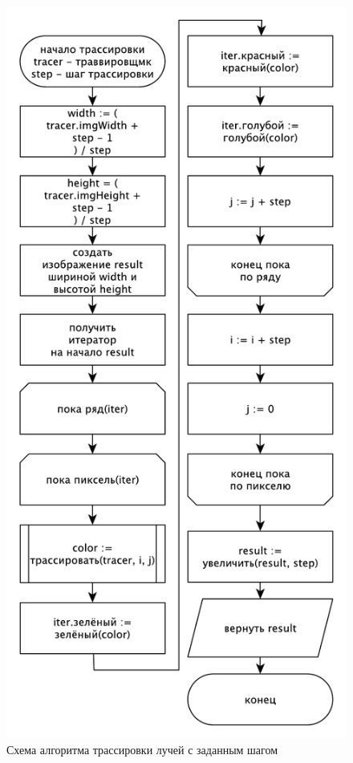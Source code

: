 {    \begin{figure}[H]
    	\centering
    	\includegraphics[height=0.9\textheight]{img/trace1.pdf}
    	\caption{Схема алгоритма трассировки лучей с заданным шагом}
    	\label{fig:trace1}
    \end{figure}

}
